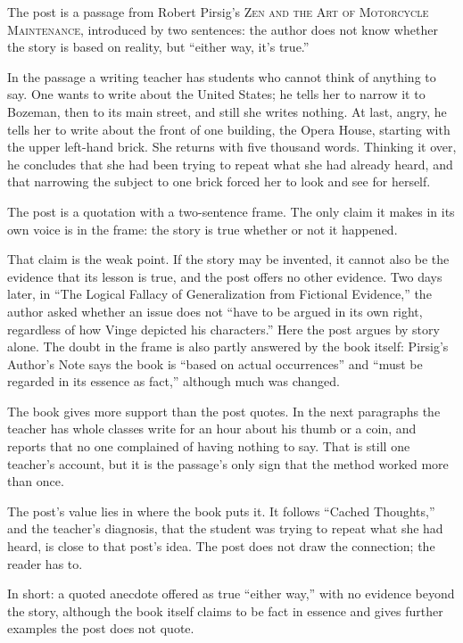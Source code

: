 \begin{afterword}
\summaryhead

The post is a passage from Robert Pirsig's \textsc{Zen and the Art of Motorcycle Maintenance}, introduced by two sentences: the author does not know whether the story is based on reality, but ``either way, it's true.''

In the passage a writing teacher has students who cannot think of anything to say. One wants to write about the United States; he tells her to narrow it to Bozeman, then to its main street, and still she writes nothing. At last, angry, he tells her to write about the front of one building, the Opera House, starting with the upper left-hand brick. She returns with five thousand words. Thinking it over, he concludes that she had been trying to repeat what she had already heard, and that narrowing the subject to one brick forced her to look and see for herself.

\responsehead

The post is a quotation with a two-sentence frame. The only claim it makes in its own voice is in the frame: the story is true whether or not it happened.

That claim is the weak point. If the story may be invented, it cannot also be the evidence that its lesson is true, and the post offers no other evidence. Two days later, in ``The Logical Fallacy of Generalization from Fictional Evidence,'' the author asked whether an issue does not ``have to be argued in its own right, regardless of how Vinge depicted his characters.'' Here the post argues by story alone. The doubt in the frame is also partly answered by the book itself: Pirsig's Author's Note says the book is ``based on actual occurrences'' and ``must be regarded in its essence as fact,'' although much was changed.

The book gives more support than the post quotes. In the next paragraphs the teacher has whole classes write for an hour about his thumb or a coin, and reports that no one complained of having nothing to say. That is still one teacher's account, but it is the passage's only sign that the method worked more than once.

The post's value lies in where the book puts it. It follows ``Cached Thoughts,'' and the teacher's diagnosis, that the student was trying to repeat what she had heard, is close to that post's idea. The post does not draw the connection; the reader has to.

In short: a quoted anecdote offered as true ``either way,'' with no evidence beyond the story, although the book itself claims to be fact in essence and gives further examples the post does not quote.
\end{afterword}
